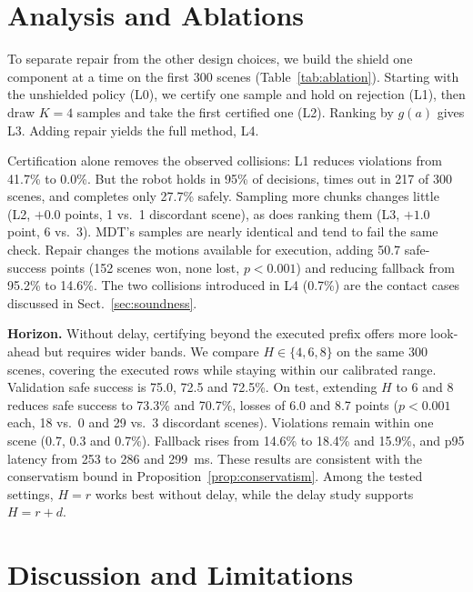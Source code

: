 \documentclass[runningheads]{llncs}
\begin{document}
\section{Analysis and Ablations}\label{sec:analysis}

To separate repair from the other design choices, we build the shield
one component at a time on the first 300 scenes (Table~\ref{tab:ablation}).
Starting with the unshielded policy (L0), we certify one sample and hold
on rejection (L1), then draw $K=4$ samples and take the first certified
one (L2). Ranking by $g(a)$ gives L3. Adding repair yields the full method, L4.

Certification alone removes the observed collisions: L1 reduces violations
from 41.7\% to 0.0\%. But the robot holds in 95\% of decisions, times out
in 217 of 300 scenes, and completes only 27.7\% safely. Sampling more
chunks changes little (L2, $+0.0$ points, 1 vs.\ 1 discordant scene), as
does ranking them (L3, $+1.0$ point, 6 vs.\ 3). MDT's samples are nearly
identical and tend to fail the same check. Repair changes the motions
available for execution, adding 50.7 safe-success points (152 scenes won,
none lost, $p<0.001$) and reducing fallback from 95.2\% to 14.6\%. The two
collisions introduced in L4 (0.7\%) are the contact cases discussed in
Sect.~\ref{sec:soundness}.

\textbf{Horizon.}\label{sec:horizon} Without delay, certifying beyond the
executed prefix offers more look-ahead but requires wider bands.
We compare $H\in\{4,6,8\}$ on the same 300 scenes, covering the executed
rows while staying within our calibrated range. Validation safe success is 75.0, 72.5 and 72.5\%.
On test, extending $H$ to 6 and 8 reduces safe success to 73.3\% and
70.7\%, losses of 6.0 and 8.7 points ($p<0.001$ each, 18 vs.\ 0 and
29 vs.\ 3 discordant scenes). Violations remain within one scene
(0.7, 0.3 and 0.7\%). Fallback rises from 14.6\% to 18.4\% and 15.9\%,
and p95 latency from 253 to 286 and 299~ms. These results are consistent
with the conservatism bound in Proposition~\ref{prop:conservatism}.
Among the tested settings, $H=r$ works best without delay, while the
delay study supports $H=r+d$.

\section{Discussion and Limitations}\label{sec:limits}
\end{document}
